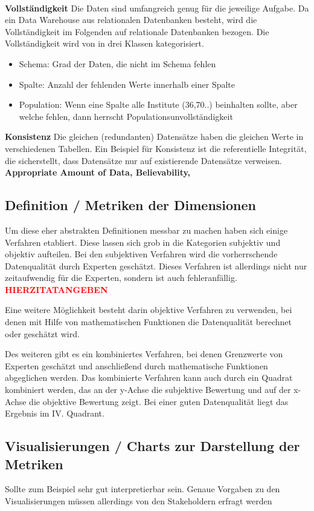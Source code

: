 \\ \textbf{Vollständigkeit}
Die Daten sind umfangreich genug für die jeweilige Aufgabe. \cite{wang1996} 
Da ein Data Warehouse aus relationalen Datenbanken besteht, wird die Vollständigkeit im Folgenden auf relationale Datenbanken bezogen.
Die Vollständigkeit wird von \cite{pipino2002} in drei Klassen kategorisiert.
\begin{itemize}
 \item Schema: Grad der Daten, die nicht im Schema fehlen
 \item Spalte: Anzahl der fehlenden Werte innerhalb einer Spalte
 \item Population: Wenn eine Spalte alle Institute (36,70..) beinhalten sollte, aber welche fehlen, dann herrscht Populationsunvollständigkeit
\end{itemize}
\textbf{Konsistenz}
Die gleichen (redundanten) Datensätze haben die gleichen Werte in verschiedenen Tabellen. 
Ein Beispiel für Konsistenz ist die referentielle Integrität, die sicherstellt, dass Datensätze nur auf existierende Datensätze verweisen.
\\ \textbf{Appropriate Amount of Data, Believability, }


\subsection{Definition / Metriken der Dimensionen}
Um diese eher abstrakten Definitionen messbar zu machen haben sich einige Verfahren etabliert.
Diese lassen sich grob in die Kategorien subjektiv und objektiv aufteilen. \cite{pipino2002}
Bei den subjektiven Verfahren wird die vorherrschende Datenqualität durch Experten geschätzt. 
Dieses Verfahren ist allerdings nicht nur zeitaufwendig für die Experten, sondern ist auch fehleranfällig. \textcolor{red}{\textbf{HIERZITATANGEBEN}} \cite{}

Eine weitere Möglichkeit besteht darin objektive Verfahren zu verwenden, bei denen mit Hilfe von mathematischen Funktionen die Datenqualität berechnet oder geschätzt wird. 

Des weiteren gibt es ein kombiniertes Verfahren, bei denen Grenzwerte von Experten geschätzt und anschließend durch mathematische Funktionen abgeglichen werden. 
Das kombinierte Verfahren kann auch durch ein Quadrat kombiniert werden, das an der y-Achse die subjektive Bewertung und auf der x-Achse die objektive Bewertung zeigt. 
Bei einer guten Datenqualität liegt das Ergebnis im IV. Quadrant. \cite{pipino2002}



\subsection{Visualisierungen / Charts zur Darstellung der Metriken}
Sollte zum Beispiel sehr gut interpretierbar sein.
Genaue Vorgaben zu den Visualisierungen müssen allerdings von den Stakeholdern erfragt werden



